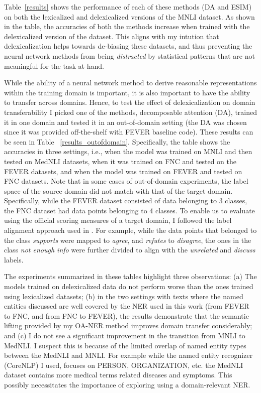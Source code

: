 \documentclass{article}
\begin{document}
Table~\ref{results} shows the performance of each of these methods (DA and ESIM) on  both the lexicalized and delexicalized versions of the MNLI dataset. As shown in the table, the accuracies of both the methods increase when trained with the delexicalized version of the dataset. This aligns with my intution that delexicalization helps towards de-biasing these datasets, and thus preventing the neural network methods from being \textit{distracted} by  statistical patterns that are not meaningful for the task at hand.
 
While the ability of a neural network method to derive reasonable representations within the training domain is important, it is also important to have the ability to transfer across domains. Hence, to test the effect of delexicalization on domain transferability I picked one of the methods, decomposable attention (DA), trained it in one domain and tested it in an out-of-domain setting (the DA was chosen since it was provided off-the-shelf with FEVER baseline code). These results can be seen in Table ~\ref{results_outofdomain}. Specifically, the table shows the accuracies in three settings, i.e., when the model was trained on MNLI and then tested on MedNLI datasets, when it was trained on FNC and  tested on the FEVER datasets, and when the model was trained on FEVER and tested on FNC datasets. Note that in some cases of out-of-domain experiments, the label space of the source domain did not match with that of the target domain. Specifically, while the FEVER dataset consisted of data belonging to 3 classes, the FNC dataset had data points belonging to 4 classes. To enable us to evaluate using the official scoring measures of a target domain, I followed the label alignment approach used in \citep*{emnlp2019sandeep}. For example, while the data points that belonged to the class \textit{supports} were mapped to \textit{agree}, and \textit{refutes} to \textit{disagree}, the ones in the class \textit{not enough info} were further divided to align with the \textit{unrelated} and \textit{discuss} labels.

The experiments summarized in these tables highlight three observations: (a) The models trained on delexicalized data do not perform worse than the ones trained using lexicalized datasets; (b) in the two settings with texts where the named entities discussed are well covered by the NER used in this work (from FEVER to FNC, and from FNC to FEVER), the results demonstrate that the semantic lifting provided by my OA-NER method improves domain transfer considerably; and (c) I do not see a significant improvement in the transition from MNLI to MedNLI.  I suspect this is because of the limited overlap of named entity types between the MedNLI and MNLI. For example while the named entity recognizer (CoreNLP) I used, focuses on PERSON, ORGANIZATION, etc. the MedNLI dataset contains more medical terms related diseases and symptoms. This possibly necessitates the importance of exploring using a domain-relevant NER.
\end{document}
